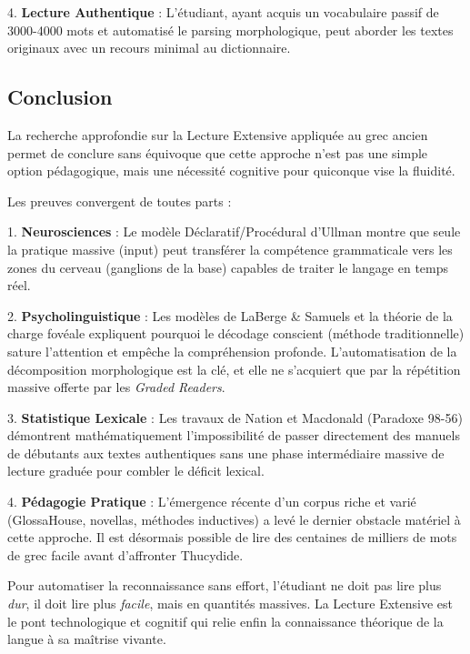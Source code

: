 4. \textbf{Lecture Authentique} : L'étudiant, ayant acquis un vocabulaire passif de 3000-4000 mots
et automatisé le parsing morphologique, peut aborder les textes originaux avec un recours minimal au
dictionnaire.



\subsection{Conclusion}

La recherche approfondie sur la Lecture Extensive appliquée au grec ancien permet de conclure sans
équivoque que cette approche n'est pas une simple option pédagogique, mais une nécessité cognitive
pour quiconque vise la fluidité.

Les preuves convergent de toutes parts :

1. \textbf{Neurosciences} : Le modèle Déclaratif/Procédural d'Ullman montre que seule la pratique
massive (input) peut transférer la compétence grammaticale vers les zones du cerveau (ganglions de
la base) capables de traiter le langage en temps réel.

2. \textbf{Psycholinguistique} : Les modèles de LaBerge \& Samuels et la théorie de la charge
fovéale expliquent pourquoi le décodage conscient (méthode traditionnelle) sature l'attention et
empêche la compréhension profonde. L'automatisation de la décomposition morphologique est la clé, et
elle ne s'acquiert que par la répétition massive offerte par les \textit{Graded Readers}.

3. \textbf{Statistique Lexicale} : Les travaux de Nation et Macdonald (Paradoxe 98-56) démontrent
mathématiquement l'impossibilité de passer directement des manuels de débutants aux textes
authentiques sans une phase intermédiaire massive de lecture graduée pour combler le déficit
lexical.

4. \textbf{Pédagogie Pratique} : L'émergence récente d'un corpus riche et varié (GlossaHouse,
novellas, méthodes inductives) a levé le dernier obstacle matériel à cette approche. Il est
désormais possible de lire des centaines de milliers de mots de grec \og facile\fg{} avant
d'affronter Thucydide.

Pour automatiser la reconnaissance sans effort, l'étudiant ne doit pas lire plus \textit{dur}, il
doit lire plus \textit{facile}, mais en quantités massives. La Lecture Extensive est le pont
technologique et cognitif qui relie enfin la connaissance théorique de la langue à sa maîtrise
vivante.


